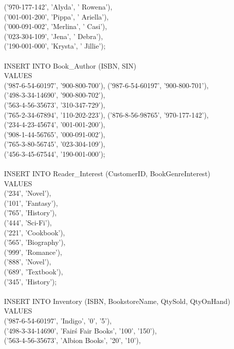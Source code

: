 \documentclass{scrreprt}
\begin{document}
       ('970-177-142', 'Alyda', ' Rowena'),\\
       ('001-001-200', 'Pippa', ' Ariella'),\\
       ('000-091-002', 'Merlina', ' Casi'),\\
       ('023-304-109', 'Jena', ' Debra'),\\
       ('190-001-000', 'Krysta', ' Jillie');\\\\
INSERT INTO Book_Author (ISBN, SIN)\\
VALUES \\('987-6-54-60197', '900-800-700'),
       ('987-6-54-60197', '900-800-701'),\\
       ('498-3-34-14690', '900-800-702'),\\
       ('563-4-56-35673', '310-347-729'),\\
       ('765-2-34-67894', '110-202-223'),
       ('876-8-56-98765', '970-177-142'),\\
       ('234-4-23-45674', '001-001-200'),\\
       ('908-1-44-56765', '000-091-002'),\\
       ('765-3-80-56745', '023-304-109'),\\
       ('456-3-45-67544', '190-001-000');\\\\
INSERT INTO Reader_Interest (CustomerID, BookGenreInterest)\\
VALUES\\ ('234', 'Novel'),\\
       ('101', 'Fantasy'),\\
       ('765', 'History'),\\
       ('444', 'Sci-Fi'),\\
       ('221', 'Cookbook'),\\
       ('565', 'Biography'),\\
       ('999', 'Romance'),\\
       ('888', 'Novel'),\\
       ('689', 'Textbook'),\\
       ('345', 'History');\\\\
INSERT INTO Inventory (ISBN, BookstoreName, QtySold, QtyOnHand)
VALUES\\ ('987-6-54-60197', 'Indigo', '0', '5'),\\
       ('498-3-34-14690', 'Fair\'s Fair Books', '100', '150'),\\
       ('563-4-56-35673', 'Albion Books', '20', '10'),\\
\end{document}
